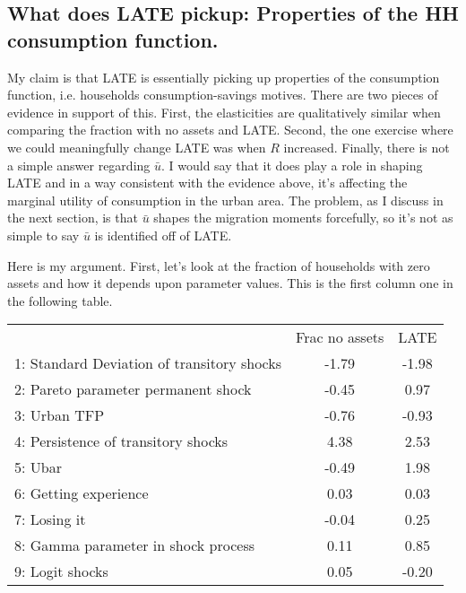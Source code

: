 \documentclass[pdftex,11pt]{article}
\renewcommand{\arraystretch}{.7}
\begin{document}
\subsection{What does LATE pickup: Properties of the HH consumption function.}

My claim is that LATE is essentially picking up properties of the consumption function, i.e. households consumption-savings motives. There are two pieces of evidence in support of this. First, the elasticities are qualitatively similar when comparing the fraction with no assets and LATE. Second, the one exercise where we could meaningfully change LATE was when $R$ increased. Finally, there is not a simple answer regarding $\bar u$. I would say that it does play a role in shaping LATE and in a way consistent with the evidence above, it's affecting the marginal utility of consumption in the urban area. The problem, as I discuss in the next section, is that $\bar u$ shapes the migration moments forcefully, so it's not as simple to say $\bar u$ is identified off of LATE.

Here is my argument. First, let's look at the fraction of households with zero assets and how it depends upon parameter values. This is the first column one in the following table.

\begin{table}[!h]
\footnotesize
\setlength {\tabcolsep}{1.5mm}
\renewcommand{\arraystretch}{2.25}
\begin{center}\label{tb:employment}
\begin{tabular}{l c c}
\hline
\hline
& Frac no assets & LATE \\
1: Standard Deviation of transitory shocks & -1.79   & -1.98  \\
2: Pareto parameter permanent shock &  -0.45         &  0.97  \\
3: Urban TFP &                           -0.76       & -0.93  \\
4: Persistence of transitory shocks &         4.38   &  2.53  \\
5: Ubar &                                    -0.49   &  1.98  \\
6: Getting experience &                       0.03   &  0.03  \\
7: Losing it &                               -0.04   &  0.25  \\
8: Gamma parameter in shock process &         0.11   &  0.85  \\
9: Logit shocks &                             0.05   & -0.20  \\
\hline
\hline
\end{tabular}
\end{center}
\end{table}
\end{document}
